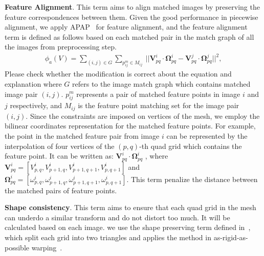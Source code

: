\documentclass[10pt,journal,compsoc]{IEEEtran}
\newcommand{\zfl}[1]{{\color{red}#1}}
\begin{document}
\textbf{Feature Alignment}.
This term aims to align matched images by preserving the feature correspondences between them.
Given the good performance in piecewise alignment, we apply APAP~\cite{journals/pami/ZaragozaCTBS14} for feature alignment, and the feature alignment term is defined as follows based on each matched pair in the match graph of all the images from preprocessing step.
\begin{equation} \label{equ:feature_align}
\begin{split}
    \phi_a(V) = \sum\limits_{(i, j)\in G}\sum\limits_{p_{ij}^m \in M_{ij}} \
    ||\mathbf{V}^{i}_{pq} \cdot  \mathbf{\Omega}^{i}_{pq} - \mathbf{V}^{j}_{pq} \cdot  \mathbf{\Omega}^{j}_{pq}||^2,
\end{split}
\end{equation}
\zfl{Please check whether the modification is correct about the equation and explanation}
where $G$ refers to the image match graph which contains matched image pair $(i, j)$. 
$p_{ij}^m$ represents a pair of matched feature points in image $i$ and $j$ respectively, and $M_{ij}$ is the feature point matching set for the image pair $(i,j)$.
Since the constraints are imposed on vertices of the mesh, we employ the bilinear coordinates representation for the matched feature points. For example, the point in the matched feature pair from image $i$ can be represented by the interpolation of four vertices of the $(p,q)$-th quad grid  which contains the feature point. It can be written as:  
$\mathbf{V}^{i}_{pq} \cdot  \mathbf{\Omega}^{i}_{pq}$ , where $\mathbf{V}^{i}_{pq}=[V^{i}_{p,q},V^{i}_{p+1,q},V^{i}_{p+1,q+1},V^{i}_{p,q+1}]$ and $\mathbf{\Omega}^{i}_{pq}=[\omega^{i}_{p,q},\omega^{i}_{p+1,q},\omega^{i}_{p+1,q+1},\omega^{i}_{p,q+1}]$. This term penalize the distance between the matched pairs of feature points.

\textbf{Shape consistency}.
This term aims to ensure that each quad grid in the mesh can underdo a similar transform and do not distort too much. It will be calculated based on each image.
we use the shape preserving term defined in~\cite{journals/tog/LiuYT013}, which split each grid into two triangles and applies the method in as-rigid-as-possible warping~\cite{journals/tog/IgarashiMH05}.
\end{document}
